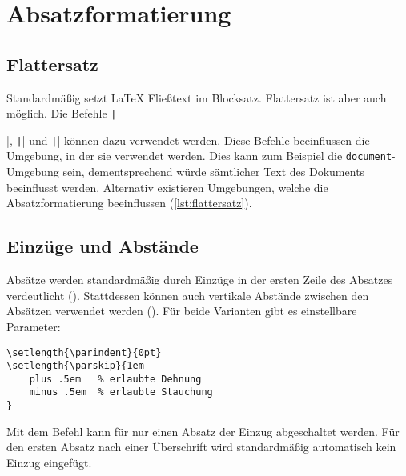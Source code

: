 \section{Absatzformatierung} %
\label{sec:absatzformatierung}

\subsection*{Flattersatz}
\label{sub:flattersatz}
Standardmäßig setzt \LaTeX{} Fließtext im Blocksatz. 
Flattersatz ist aber auch möglich. 
Die Befehle \texttt|\raggedright|, \texttt|\raggedleft| und \texttt|\centering| können dazu verwendet werden. 
Diese Befehle beeinflussen die Umgebung, in der sie verwendet werden. 
Dies kann zum Beispiel die \texttt{document}-Umgebung sein, dementsprechend würde sämtlicher Text des Dokuments beeinflusst werden.
Alternativ existieren Umgebungen, welche die Absatzformatierung beeinflussen (\cref{lst:flattersatz}).


\subsection*{Einzüge und Abstände}
\label{sub:einzüge_und_abstände}
Absätze werden standardmäßig durch Einzüge in der ersten Zeile des Absatzes verdeutlicht (\texttt{\parindent}). 
Stattdessen können auch vertikale Abstände zwischen den Absätzen verwendet werden (\texttt{\parskip}). 
Für beide Varianten gibt es einstellbare Parameter:
\begin{verbatim}
\setlength{\parindent}{0pt}
\setlength{\parskip}{1em
    plus .5em   % erlaubte Dehnung
    minus .5em  % erlaubte Stauchung
}
\end{verbatim}
Mit dem Befehl \texttt{\noindent} kann für nur einen Absatz der Einzug abgeschaltet werden. 
Für den ersten Absatz nach einer Überschrift wird standardmäßig automatisch kein Einzug eingefügt.

